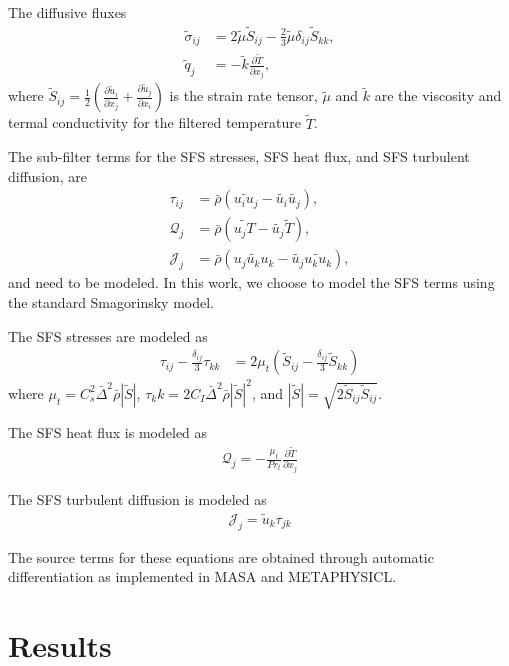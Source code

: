 \documentclass[10pt]{article}
\newcommand{\pfrac}[2]{\frac{\partial#1}{\partial#2}}
\newcommand{\wt}[1]{\widetilde{#1}}
\begin{document}
The diffusive fluxes
\begin{align}
  \wt{\sigma}_{ij} &= 2 \wt{\mu} \wt{S}_{ij} - \frac{2}{3} \wt{\mu} \delta_{ij}  \wt{S}_{kk},\\
  \wt{q}_j &= - \wt{k} \pfrac{\wt{T}}{x_j},
\end{align}
where $\wt{S}_{ij} = \frac{1}{2} \left( \pfrac{\wt{u}_i}{x_j} +
\pfrac{\wt{u}_j}{x_i}\right)$ is the strain rate tensor, $\wt{\mu}$
and $\wt{k}$ are the viscosity and termal conductivity for the
filtered temperature $\wt{T}$.

The sub-filter terms for the SFS stresses, SFS heat flux, and SFS
turbulent diffusion, are
\begin{align}
  \tau_{ij} &= \bar{\rho} \left(\wt{u_i u_j} - \wt{u_i}\wt{u_j}\right),\\
  \mathcal{Q}_j &= \bar{\rho} \left(\wt{u_j T} - \wt{u_j}\wt{T}\right),\\
  \mathcal{J}_j &= \bar{\rho} \left(\wt{u_j u_k u_k} - \wt{u_j}\wt{u_k u_k}\right),
\end{align}
and need to be modeled. In this work, we choose to model the SFS terms
using the standard Smagorinsky model.

The SFS stresses are modeled as
\begin{align}
  \tau_{ij} - \frac{\delta_{ij}}{3} \tau_{kk} &= 2 \mu_t \left(\wt{S}_{ij} - \frac{\delta_{ij}}{3}  \wt{S}_{kk} \right)
\end{align}
where $\mu_t = C_s^2 \bar{\Delta}^2 \bar{\rho} |\wt{S}|$, $\tau_kk = 2
C_I \bar{\Delta}^2 \bar{\rho} |\wt{S}|^2$, and $|\wt{S}| = \sqrt{2
  \wt{S}_{ij}\wt{S}_{ij}}$.

The SFS heat flux is modeled as
\begin{align}
  \mathcal{Q}_j = - \frac{\mu_t}{Pr_t} \pfrac{\wt{T}}{x_j}
\end{align}

The SFS turbulent diffusion is modeled as
\begin{align}
  \mathcal{J}_j = \wt{u}_k \tau_{jk}
\end{align}

The source terms for these equations are obtained through automatic
differentiation as implemented in MASA and METAPHYSICL.

\section{Results}
\end{document}
